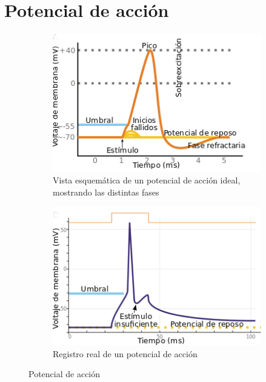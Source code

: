 \section{Potencial de acción}
\begin{figure}[htbp!]
        \centering
        \begin{subfigure}[b]{0.4\textwidth}
            \centering
            \includegraphics[width=\textwidth]{figures/potencial_accion_esquematico.png}
            \caption{Vista esquemática de un potencial de acción ideal, mostrando las distintas fases}
            \label{fig:potencial_accion_ideal}
        \end{subfigure}
        \hspace{1.25cm}
        \begin{subfigure}[b]{0.4\textwidth}  
            \centering 
            \includegraphics[width=\textwidth]{figures/potencial_accion_real.png}
            \caption{Registro real de un potencial de acción}
            \label{fig:potencial_accion_real}
        \end{subfigure}
        \quad
        \caption{Potencial de acción}
        \label{fig:potencial_accion}
\end{figure}
